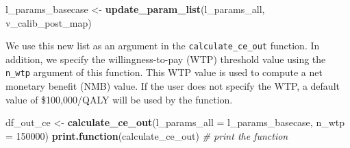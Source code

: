 \documentclass[]{book}
\newenvironment{Shaded}{\begin{snugshade}}{\end{snugshade}}
\newcommand{\KeywordTok}[1]{\textcolor[rgb]{0.13,0.29,0.53}{\textbf{#1}}}
\newcommand{\DataTypeTok}[1]{\textcolor[rgb]{0.13,0.29,0.53}{#1}}
\newcommand{\DecValTok}[1]{\textcolor[rgb]{0.00,0.00,0.81}{#1}}
\newcommand{\StringTok}[1]{\textcolor[rgb]{0.31,0.60,0.02}{#1}}
\newcommand{\CommentTok}[1]{\textcolor[rgb]{0.56,0.35,0.01}{\textit{#1}}}
\newcommand{\NormalTok}[1]{#1}
\begin{document}
\begin{Shaded}
\begin{Highlighting}[]
\NormalTok{l_params_basecase <-}\StringTok{ }\KeywordTok{update_param_list}\NormalTok{(l_params_all, v_calib_post_map) }
\end{Highlighting}
\end{Shaded}

We use this new list as an argument in the \texttt{calculate\_ce\_out}
function. In addition, we specify the willingness-to-pay (WTP) threshold
value using the \texttt{n\_wtp} argument of this function. This WTP
value is used to compute a net monetary benefit (NMB) value. If the user
does not specify the WTP, a default value of \$100,000/QALY will be used
by the function.

\begin{Shaded}
\begin{Highlighting}[]
\NormalTok{df_out_ce <-}\StringTok{ }\KeywordTok{calculate_ce_out}\NormalTok{(}\DataTypeTok{l_params_all =}\NormalTok{ l_params_basecase, }
                                \DataTypeTok{n_wtp =} \DecValTok{150000}\NormalTok{)}
\KeywordTok{print.function}\NormalTok{(calculate_ce_out) }\CommentTok{# print the function}
\end{Highlighting}
\end{Shaded}
\end{document}
